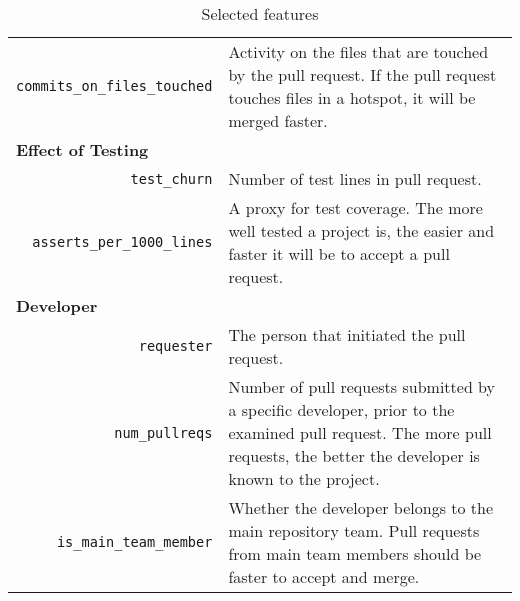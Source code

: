 \documentclass{sig-alternate}
\begin{document}
\begin{table*}
\begin{small}
\begin{tabular}{rp{25em}}
    \texttt{commits\_on\_files\_touched} & Activity on the files that are
    touched by the pull request. If the pull request touches files in a hotspot,
    it will be merged faster.\\
    
    \multicolumn{2}{l}{\bf{Effect of Testing}}\\

    \texttt{test\_churn} & Number of test lines in pull request. \\

    \texttt{asserts\_per\_1000\_lines} & A proxy for test coverage. The
    more well tested a project is, the easier and faster it will be to accept 
    a pull request.\\
    
    \multicolumn{2}{l}{\bf{Developer}}\\
    
    \texttt{requester} & The person that initiated the pull request.\\

    \texttt{num\_pullreqs} & Number of pull requests submitted by a specific
    developer, prior to the examined pull request. The more pull requests, the
    better the developer is known to the project.\\

    \texttt{is\_main\_team\_member} & Whether the developer belongs to the
    main repository team. Pull requests from main team members should be
    faster to accept and merge.\\
    \hline
  \end{tabular}
  \caption{Selected features}
  \label{tab:features}
  \end{small}
\end{table*}
\end{document}
